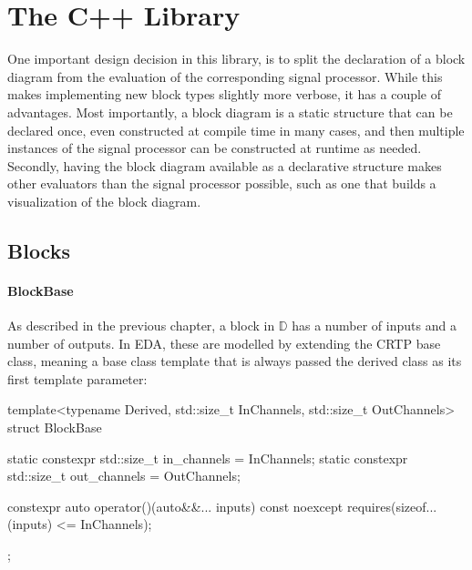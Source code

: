 \chapter{The C++ Library}
\label{chap:cpp_lib}

% 

One important design decision in this library, is to split the declaration of a block diagram from the
evaluation of the corresponding signal processor. While this makes implementing new block types slightly more
verbose, it has a couple of advantages. Most importantly, a block diagram is a static structure that can be
declared once, even constructed at compile time in many cases, and then multiple instances of the signal
processor can be constructed at runtime as needed. Secondly, having the block diagram available as a
declarative structure makes other evaluators than the signal processor possible, such as one that builds a
visualization of the block diagram.

\section{Blocks}

\subsubsection{BlockBase}

As described in the previous chapter, a block in $\mathbb D$ has a number of inputs and a number
of outputs. In EDA, these are modelled by extending the  CRTP\footnotemark{} base class, meaning a base
class template that is always passed the derived class as its first template parameter:


\begin{cppcodenl}
  template<typename Derived, std::size_t InChannels, std::size_t OutChannels>
  struct BlockBase {
    static constexpr std::size_t in_channels = InChannels;
    static constexpr std::size_t out_channels = OutChannels;

    constexpr auto operator()(auto&&... inputs) const noexcept
    requires(sizeof...(inputs) <= InChannels);
  };
\end{cppcodenl}

